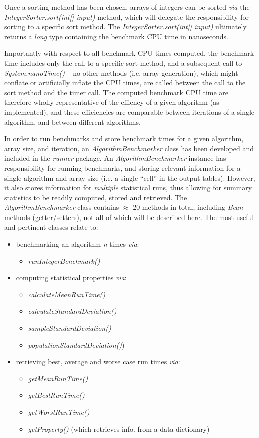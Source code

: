 \documentclass[12pt,a4paper]{article}
\begin{document}
Once a sorting method has been chosen, arrays of integers can be sorted \emph{via} the \emph{IntegerSorter.sort(int[] input)} method, which will delegate the responsibility for sorting to a specific sort method. The \emph{IntegerSorter.sort(int[] input)} ultimately returns a \emph{long} type containing the benchmark CPU time in nanoseconds. 

Importantly with respect to all benchmark CPU times computed, the benchmark time includes only the call to a specific sort method, and a subsequent call to \emph{System.nanoTime()} -- no other methods (i.e. array generation), which might conflate or artificially inflate the CPU times, are called between the call to the sort method and the timer call. The computed benchmark CPU time are therefore wholly representative of the effiency of a given algorithm (as implemented), and these efficiencies are comparable between iterations of a single algorithm, and between different algorithms.

In order to run benchmarks and store benchmark times for a given algorithm, array size, and iteration, an \emph{AlgorithmBenchmarker} class has been developed and included in the \emph{runner} package. An \emph{AlgorithmBenchmarker} instance has responsibility for running benchmarks, and storing relevant information for a single algorithm and array size (i.e. a single ``cell'' in the output tables). However, it also stores information for \emph{multiple} statistical runs, thus allowing for summary statistics to be readily computed, stored and retrieved. The \emph{AlgorithmBenchmarker} class contains $\approx$ 20 methods in total, including \emph{Bean}-methods (getter/setters), not all of which will be described here. The most useful and pertinent classes relate to:

\begin{itemize}
	\item benchmarking an algorithm \emph{n} times \emph{via}:
	\begin{itemize}
		\item \emph{runIntegerBenchmark()}
	\end{itemize}
	\item computing statistical properties \emph{via}: 
	\begin{itemize}
		\item \emph{calculateMeanRunTime()}
		\item \emph{calculateStandardDeviation()}
		\item \emph{sampleStandardDeviation()}
		\item \emph{populationStandardDeviation()})
	\end{itemize}
	\item retrieving best, average and worse case run times \emph{via}:
		\begin{itemize}
		\item \emph{getMeanRunTime()}
		\item \emph{getBestRunTime()}
		\item \emph{getWorstRunTime()}
		\item \emph{getProperty()} (which retrieves info. from a data dictionary)
		\end{itemize}
\end{itemize}
\end{document}
